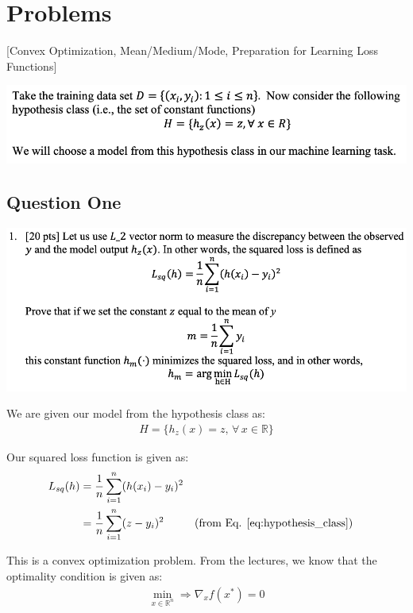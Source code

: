 \section{Problems}

[Convex Optimization, Mean/Medium/Mode, Preparation for Learning Loss Functions]

\includegraphics[width=1\textwidth]{media/problems_intro.png}

\subsection{Question One}
\includegraphics[width=1\textwidth]{media/q1.png}

We are given our model from the hypothesis class as:
\begin{align}
    H = \{ h_z(x) = z, \, \forall \, x \in \mathbb{R} \} \label{eq:hypothesis_class}
\end{align}

Our squared loss function is given as:
\begin{align}
    L_{sq}(h) &= \frac{1}{n} \sum_{i=1}^n (h(x_i)-y_i)^2 \label{eq:sq_loss} \nonumber \\
    &= \frac{1}{n} \sum_{i=1}^n (z-y_i)^2 && \text{(from Eq. \ref{eq:hypothesis_class})}
\end{align}

This is a convex optimization problem. From the lectures, we know that the optimality condition is given as: 
\begin{align}
    \min_{x \in \mathbb{R}^n} \Rightarrow \nabla_x f(x^*) = 0 \label{eq:optimization_condition}
\end{align}

